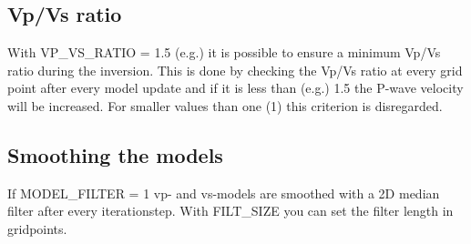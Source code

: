 \subsection{Vp/Vs ratio}
{\color{blue}{\begin{verbatim}
"Minimum Vp/Vs-ratio" : "comment",
"VP_VS_RATIO" : "1.5",
\end{verbatim}}}
{\color{red}{\begin{verbatim}
Default values are:
	VP_VS_RATIO > 1
\end{verbatim}}}
With VP\_VS\_RATIO = 1.5 (e.g.) it is possible to ensure a minimum Vp/Vs ratio during the inversion. This is done by checking the Vp/Vs ratio at every grid point after every model update and if it is less than (e.g.) 1.5 the P-wave velocity will be increased. For smaller values than one (1) this criterion is disregarded.

\subsection{Smoothing the models}
{\color{blue}{\begin{verbatim}
"Definition of smoothing the models vp and vs" : "comment",
			"MODEL_FILTER" : "0",
			"FILT_SIZE" : "5",
\end{verbatim}}}

{\color{red}{\begin{verbatim}
Default values are:
	MODEL_FILTER=0
\end{verbatim}}}

If MODEL\_FILTER = 1 vp- and vs-models are smoothed with a 2D median filter after every iterationstep. With FILT\_SIZE you can set the filter length in gridpoints.

